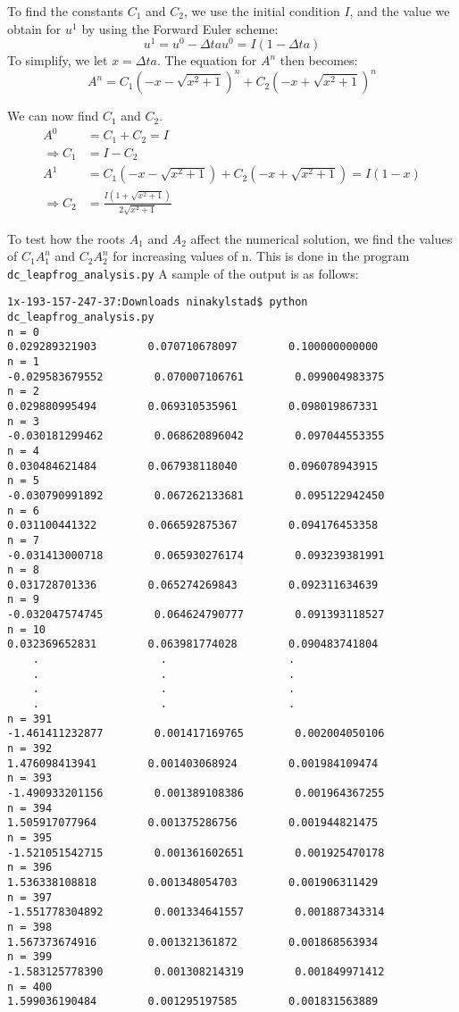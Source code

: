 \documentclass[a4paper,12pt]{report}
\newcommand{\Dt}{\Delta t}
\begin{document}
To find the constants $C_1$ and $C_2$, we use the initial condition $I$, and the value we obtain for $u^1$ by using the Forward Euler scheme:
\[u^1 = u^0 - \Dt au^0 = I(1 - \Dt a)\]
To simplify, we let $x = \Dt a$. The equation for $A^n$ then becomes:
\begin{equation}
A^n = C_1(-x - \sqrt{x^2 +1})^n + C_2(-x + \sqrt{x^2 +1})^n
\end{equation}

We can now find $C_1$ and $C_2$.
\begin{align*}
A^0 &= C_1 + C_2 = I\\
\Rightarrow C_1 &= I - C_2\\
A^1 &= C_1(-x - \sqrt{x^2 +1}) + C_2(-x + \sqrt{x^2 +1}) = I(1 - x)\\
\Rightarrow C_2 &= \frac{I(1 + \sqrt{x^2 +1})}{2\sqrt{x^2 +1}}
\end{align*}

To test how the roots $A_1$ and $A_2$ affect the numerical solution, we find the values of $C_1A_1^n$ and $C_2A_2^n$ for increasing values of n. This is done in the program \texttt{dc\_leapfrog\_analysis.py} A sample of the output is as follows:

\begin{verbatim}
1x-193-157-247-37:Downloads ninakylstad$ python dc_leapfrog_analysis.py
n = 0
0.029289321903        0.070710678097        0.100000000000
n = 1
-0.029583679552        0.070007106761        0.099004983375
n = 2
0.029880995494        0.069310535961        0.098019867331
n = 3
-0.030181299462        0.068620896042        0.097044553355
n = 4
0.030484621484        0.067938118040        0.096078943915
n = 5
-0.030790991892        0.067262133681        0.095122942450
n = 6
0.031100441322        0.066592875367        0.094176453358
n = 7
-0.031413000718        0.065930276174        0.093239381991
n = 8
0.031728701336        0.065274269843        0.092311634639
n = 9
-0.032047574745        0.064624790777        0.091393118527
n = 10
0.032369652831        0.063981774028        0.090483741804
	.					.					.
	.					.					.
	.					.					.
	.					.					.
n = 391
-1.461411232877        0.001417169765        0.002004050106
n = 392
1.476098413941        0.001403068924        0.001984109474
n = 393
-1.490933201156        0.001389108386        0.001964367255
n = 394
1.505917077964        0.001375286756        0.001944821475
n = 395
-1.521051542715        0.001361602651        0.001925470178
n = 396
1.536338108818        0.001348054703        0.001906311429
n = 397
-1.551778304892        0.001334641557        0.001887343314
n = 398
1.567373674916        0.001321361872        0.001868563934
n = 399
-1.583125778390        0.001308214319        0.001849971412
n = 400
1.599036190484        0.001295197585        0.001831563889
\end{verbatim}
\end{document}
